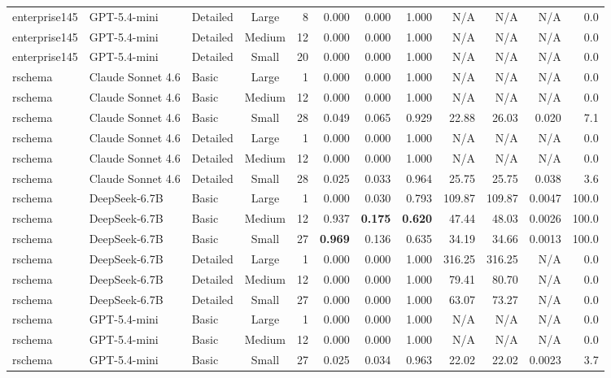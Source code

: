 \begin{table}[t]
\begin{tabular}{lllcrrrrrrrr}
enterprise145 & GPT-5.4-mini & Detailed & Large & 8 & 0.000 & 0.000 & 1.000 & N/A & N/A & N/A & 0.0 \\
enterprise145 & GPT-5.4-mini & Detailed & Medium & 12 & 0.000 & 0.000 & 1.000 & N/A & N/A & N/A & 0.0 \\
enterprise145 & GPT-5.4-mini & Detailed & Small & 20 & 0.000 & 0.000 & 1.000 & N/A & N/A & N/A & 0.0 \\
\midrule
rschema & Claude Sonnet 4.6 & Basic & Large & 1 & 0.000 & 0.000 & 1.000 & N/A & N/A & N/A & 0.0 \\
rschema & Claude Sonnet 4.6 & Basic & Medium & 12 & 0.000 & 0.000 & 1.000 & N/A & N/A & N/A & 0.0 \\
rschema & Claude Sonnet 4.6 & Basic & Small & 28 & 0.049 & 0.065 & 0.929 & 22.88 & 26.03 & 0.020 & 7.1 \\
rschema & Claude Sonnet 4.6 & Detailed & Large & 1 & 0.000 & 0.000 & 1.000 & N/A & N/A & N/A & 0.0 \\
rschema & Claude Sonnet 4.6 & Detailed & Medium & 12 & 0.000 & 0.000 & 1.000 & N/A & N/A & N/A & 0.0 \\
rschema & Claude Sonnet 4.6 & Detailed & Small & 28 & 0.025 & 0.033 & 0.964 & 25.75 & 25.75 & 0.038 & 3.6 \\
rschema & DeepSeek-6.7B & Basic & Large & 1 & 0.000 & 0.030 & 0.793 & 109.87 & 109.87 & 0.0047 & 100.0 \\
rschema & DeepSeek-6.7B & Basic & Medium & 12 & 0.937 & \textbf{0.175} & \textbf{0.620} & 47.44 & 48.03 & 0.0026 & 100.0 \\
rschema & DeepSeek-6.7B & Basic & Small & 27 & \textbf{0.969} & 0.136 & 0.635 & 34.19 & 34.66 & 0.0013 & 100.0 \\
rschema & DeepSeek-6.7B & Detailed & Large & 1 & 0.000 & 0.000 & 1.000 & 316.25 & 316.25 & N/A & 0.0 \\
rschema & DeepSeek-6.7B & Detailed & Medium & 12 & 0.000 & 0.000 & 1.000 & 79.41 & 80.70 & N/A & 0.0 \\
rschema & DeepSeek-6.7B & Detailed & Small & 27 & 0.000 & 0.000 & 1.000 & 63.07 & 73.27 & N/A & 0.0 \\
rschema & GPT-5.4-mini & Basic & Large & 1 & 0.000 & 0.000 & 1.000 & N/A & N/A & N/A & 0.0 \\
rschema & GPT-5.4-mini & Basic & Medium & 12 & 0.000 & 0.000 & 1.000 & N/A & N/A & N/A & 0.0 \\
rschema & GPT-5.4-mini & Basic & Small & 27 & 0.025 & 0.034 & 0.963 & 22.02 & 22.02 & 0.0023 & 3.7 \\

\end{tabular}
\end{table}
